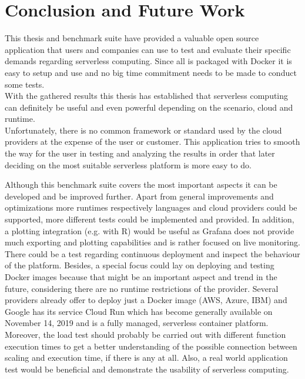 
\section{Conclusion and Future Work}\label{sec:conclusion}
This thesis and benchmark suite have provided a valuable open source application that users and companies can use to test and evaluate their specific demands regarding serverless computing. Since all is packaged with Docker it is easy to setup and use and no big time commitment needs to be made to conduct some tests.\\
With the gathered results this thesis has established that serverless computing can definitely be useful and even powerful depending on the scenario, cloud and runtime.\\
Unfortunately, there is no common framework or standard used by the cloud providers at the expense of the user or customer. This application tries to smooth the way for the user in testing and analyzing the results in order that later deciding on the most suitable serverless platform is more easy to do.

Although this benchmark suite covers the most important aspects it can be developed and be improved further. Apart from general improvements and optimizations more runtimes respectively languages and cloud providers could be supported, more different tests could be implemented and provided. In addition, a plotting integration (e.g. with R) would be useful as Grafana does not provide much exporting and plotting capabilities and is rather focused on live monitoring.\\
There could be a test regarding continuous deployment and inspect the behaviour of the platform. Besides, a special focus could lay on deploying and testing Docker images because that might be an important aspect and trend in the future, considering there are no runtime restrictions of the provider. Several providers already offer to deploy just a Docker image (AWS, Azure, IBM) and Google has its service Cloud Run which has become generally available on November 14, 2019 \cite{cloudrun} and is a fully managed, serverless container platform.\\ Moreover, the load test should probably be carried out with different function execution times to get a better understanding of the possible connection between scaling and execution time, if there is any at all. Also, a real world application test would be beneficial and demonstrate the usability of serverless computing.